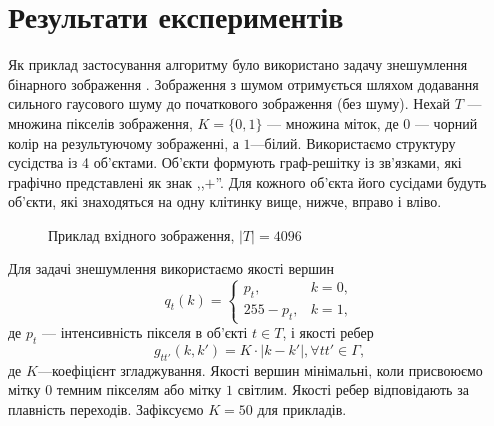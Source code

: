 \section{Результати експериментів}

Як приклад застосування алгоритму було використано задачу знешумлення бінарного зображення 
\cite{Boykov,Boykov_2,comp_vision,Greig_port}. Зображення з шумом отримується шляхом додавання сильного
гаусового шуму до початкового зображення (без шуму). 
Нехай $T$ --- множина пікселів зображення, $K=\{0,1\}$ --- множина міток, де $0$ --- чорний колір 
на результуючому зображенні, а $1$---білий. Використаємо структуру 
сусідства із 4 об'єктами. Об'єкти формують граф-решітку із зв'язками, які графічно представлені як знак ,,$+$''.
Для кожного об'єкта його сусідами будуть об'єкти, які знаходяться на одну клітинку вище, нижче, вправо і вліво.
\begin{figure}[h]
    \centering
    \qquad
    \caption{Приклад вхідного зображення, $|T|=4096$}%
    \label{fig:a2_original}
\end{figure}

Для задачі знешумлення використаємо якості вершин 
\begin{equation}
    q_t(k) = 
    \begin{cases}
        p_t, & k = 0,\\
        255-p_t, & k = 1,
    \end{cases}
\end{equation}
де $p_t$ --- інтенсивність пікселя в об'єкті $t\in T$, 
і якості ребер
\begin{equation}
    g_{tt'}(k,k') = K\cdot|k-k'|, \forall tt'\in\Gamma,
\end{equation}
де $K$---коефіцієнт згладжування.
Якості вершин мінімальні, коли присвоюємо мітку $0$ темним пікселям або мітку $1$ світлим.
Якості ребер відповідають за плавність переходів. Зафіксуємо $K=50$ для прикладів.